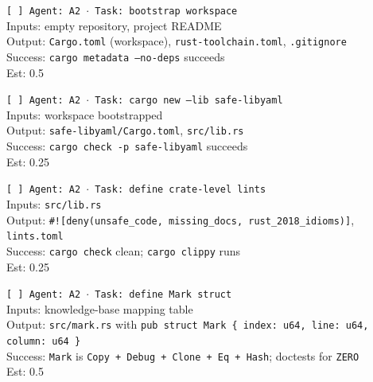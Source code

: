 \documentclass[12pt]{article}
\theoremstyle{definition}
\theoremstyle{remark}
\begin{document}
\begin{small}
\noindent\texttt{[ ] Agent: A2 $\cdot$ Task: bootstrap workspace}\\
\hspace*{2em}Inputs: empty repository, project README\\
\hspace*{2em}Output: \texttt{Cargo.toml} (workspace), \texttt{rust-toolchain.toml}, \texttt{.gitignore}\\
\hspace*{2em}Success: \texttt{cargo metadata --no-deps} succeeds\\
\hspace*{2em}Est: 0.5

\noindent\texttt{[ ] Agent: A2 $\cdot$ Task: cargo new --lib safe-libyaml}\\
\hspace*{2em}Inputs: workspace bootstrapped\\
\hspace*{2em}Output: \texttt{safe-libyaml/Cargo.toml}, \texttt{src/lib.rs}\\
\hspace*{2em}Success: \texttt{cargo check -p safe-libyaml} succeeds\\
\hspace*{2em}Est: 0.25

\noindent\texttt{[ ] Agent: A2 $\cdot$ Task: define crate-level lints}\\
\hspace*{2em}Inputs: \texttt{src/lib.rs}\\
\hspace*{2em}Output: \texttt{\#![deny(unsafe\_code, missing\_docs, rust\_2018\_idioms)]}, \texttt{lints.toml}\\
\hspace*{2em}Success: \texttt{cargo check} clean; \texttt{cargo clippy} runs\\
\hspace*{2em}Est: 0.25

\noindent\texttt{[ ] Agent: A2 $\cdot$ Task: define Mark struct}\\
\hspace*{2em}Inputs: knowledge-base mapping table\\
\hspace*{2em}Output: \texttt{src/mark.rs} with \texttt{pub struct Mark \{ index: u64, line: u64, column: u64 \}}\\
\hspace*{2em}Success: \texttt{Mark} is \texttt{Copy + Debug + Clone + Eq + Hash}; doctests for \texttt{ZERO}\\
\hspace*{2em}Est: 0.5


\end{small}
\end{document}
